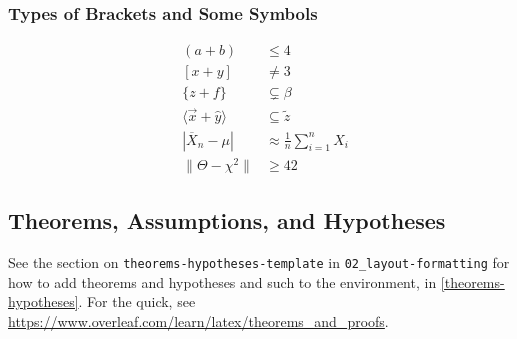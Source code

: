  \subsubsection{Types of Brackets and Some Symbols}
 
 \begin{align}
	& (a+b) 							& \leq  4\\
 	& [x+y] 							& \neq  3\\
 	& \{ z+f\} 							& \subsetneq \beta\\
 	& \langle \vec{x} + \hat{y} \rangle & \subseteq \tilde{z}\\
 	& | \overline{X}_n - \mu | 			& \approx \frac{1}{n}\sum_{i=1}^{n} X_i \\
 	& \| \Theta - \chi^2 \| 			& \geq 42
 \end{align}

\subsection{Theorems, Assumptions, and Hypotheses}
 See the section on \verb+theorems-hypotheses-template+ in \verb+02_layout-formatting+ for how to add theorems and hypotheses and such to the environment, in \ref{theorems-hypotheses}. For the quick, see \url{https://www.overleaf.com/learn/latex/theorems_and_proofs}.
 